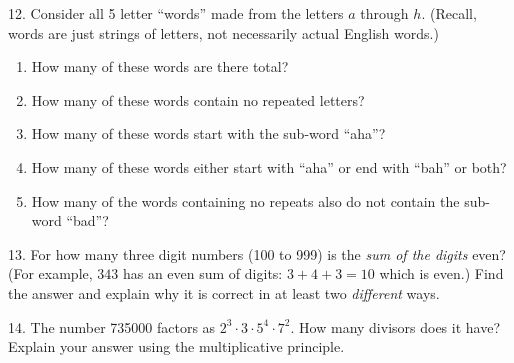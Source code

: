 \documentclass[12pt,]{book}
\theoremstyle{plain}
\theoremstyle{definition}
\theoremstyle{definition}
\theoremstyle{definition}
\numberwithin{equation}{chapter}
\begin{document}
\begin{exerciselist}
\begin{enumerate}[label=(\alph*)]
\end{enumerate}
%
\par\smallskip
\item[12.]\hypertarget{exercise-99}{}\hypertarget{p-806}{}%
Consider all 5 letter ``words'' made from the letters \(a\) through \(h\). (Recall, words are just strings of letters, not necessarily actual English words.) \leavevmode%
\begin{enumerate}[label=(\alph*)]
\item\hypertarget{li-369}{}\hypertarget{p-807}{}%
How many of these words are there total?%
\item\hypertarget{li-370}{}\hypertarget{p-808}{}%
How many of these words contain no repeated letters?%
\item\hypertarget{li-371}{}\hypertarget{p-809}{}%
How many of these words start with the sub-word ``aha''?%
\item\hypertarget{li-372}{}\hypertarget{p-810}{}%
How many of these words either start with ``aha'' or end with ``bah'' or both?%
\item\hypertarget{li-373}{}\hypertarget{p-811}{}%
How many of the words containing no repeats also do not contain the sub-word ``bad''?%
\end{enumerate}
%
\par\smallskip
\item[13.]\hypertarget{exercise-100}{}\hypertarget{p-814}{}%
For how many three digit numbers (100 to 999) is the \emph{sum of the digits} even? (For example, \(343\) has an even sum of digits: \(3+4+3 = 10\) which is even.) Find the answer and explain why it is correct in at least two \emph{different} ways.%
\par\smallskip
\item[14.]\hypertarget{exercise-101}{}\hypertarget{p-815}{}%
The number 735000 factors as \(2^3 \cdot 3 \cdot 5^4 \cdot 7^2\). How many divisors does it have? Explain your answer using the multiplicative principle.%
\par\smallskip
\end{exerciselist}
\typeout{************************************************}
\typeout{************************************************}
\end{document}
